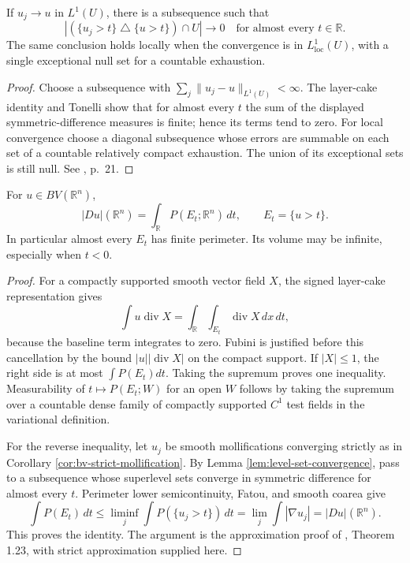 \begin{lemma}\label{lem:level-set-convergence}
If $u_j\to u$ in $L^1(U)$, there is a subsequence such that
\[
 |(\{u_j>t\}\mathbin{\triangle}\{u>t\})\cap U|\longrightarrow0
 \quad\text{for almost every }t\in\mathbb R.
\]
The same conclusion holds locally when the convergence is in $L^1_{\mathrm{loc}}(U)$, with a single exceptional null set for a countable exhaustion.
\end{lemma}
\begin{proof}
Choose a subsequence with $\sum_j\|u_j-u\|_{L^1(U)}<\infty$. The layer-cake identity and Tonelli show that for almost every $t$ the sum of the displayed symmetric-difference measures is finite; hence its terms tend to zero. For local convergence choose a diagonal subsequence whose errors are summable on each set of a countable relatively compact exhaustion. The union of its exceptional sets is still null. See \cite{Giu84}, p.~21.
\end{proof}

\begin{theorem}\label{thm:bv-coarea-global}
For $u\in BV(\mathbb R^n)$,
\[
 |Du|(\mathbb R^n)=\int_{\mathbb R}P(E_t;\mathbb R^n)\,dt,
 \qquad E_t=\{u>t\}.
\]
In particular almost every $E_t$ has finite perimeter. Its volume may be infinite, especially when $t<0$.
\end{theorem}
\begin{proof}
For a compactly supported smooth vector field $X$, the signed layer-cake representation gives
\[
 \int u\operatorname{div}X
 =\int_{\mathbb R}\int_{E_t}\operatorname{div}X\,dx\,dt,
\]
because the baseline term integrates to zero. Fubini is justified before this cancellation by the bound $|u||\operatorname{div}X|$ on the compact support. If $|X|\leq1$, the right side is at most $\int P(E_t)dt$. Taking the supremum proves one inequality. Measurability of $t\mapsto P(E_t;W)$ for an open $W$ follows by taking the supremum over a countable dense family of compactly supported $C^1$ test fields in the variational definition.

For the reverse inequality, let $u_j$ be smooth mollifications converging strictly as in Corollary \ref{cor:bv-strict-mollification}. By Lemma \ref{lem:level-set-convergence}, pass to a subsequence whose superlevel sets converge in symmetric difference for almost every $t$. Perimeter lower semicontinuity, Fatou, and smooth coarea give
\[
 \int P(E_t)\,dt\leq\liminf_j\int P(\{u_j>t\})\,dt
 =\lim_j\int|\nabla u_j|=|Du|(\mathbb R^n).
\]
This proves the identity. The argument is the approximation proof of \cite{Giu84}, Theorem 1.23, with strict approximation supplied here.
\end{proof}

